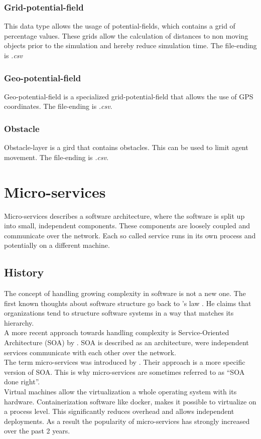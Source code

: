 \subsubsection{Grid-potential-field}
This data type allows the usage of potential-fields, which contains a grid of percentage values. These grids allow the calculation of distances to non moving objects prior to the simulation and hereby reduce simulation time. The file-ending is \textit{.csv}

\subsubsection{Geo-potential-field}
Geo-potential-field is a specialized grid-potential-field that allows the use of GPS coordinates. The file-ending is \textit{.csv}.

\subsubsection{Obstacle}
Obstacle-layer is a gird that contains obstacles. This can be used to limit agent movement. The file-ending is \textit{.csv}.



\section{Micro-services}
\label{sec:micro-services}
Micro-services describes a software architecture, where the software is split up into small, independent components. These components are loosely coupled and communicate over the network. Each so called service runs in its own process and potentially on a different machine.


\subsection{History}
The concept of handling growing complexity in software is not a new one. The first known thoughts about software structure go back to \citeauthor{conway1968committees}'s law \citeyearpar{conway1968committees}. He claims that organizations tend to structure software systems in a way that matches its hierarchy.\\
A more recent approach towards handling complexity is Service-Oriented Architecture (SOA) by \cite{as2005service}. SOA is described as an architecture, were independent services communicate with each other over the network.\\
The term micro-services was introduced by \cite{martinfowler2014microservices}. Their approach is a more specific version of SOA. This is why micro-services are sometimes referred to as \enquote{SOA done right}.\\
Virtual machines allow the virtualization a whole operating system with its hardware. Containerization software like docker, makes it possible to virtualize on a process level. This significantly reduces overhead and allows independent deployments. As a result the popularity of micro-services has strongly increased over the past 2 years.


